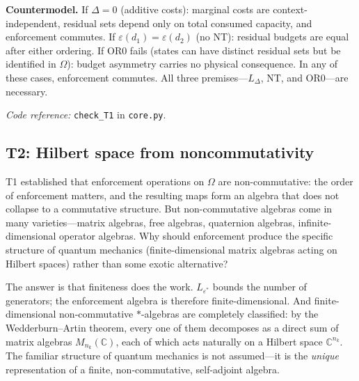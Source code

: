 \documentclass[11pt]{article}
\newcommand{\coderef}[2]{\smallskip\noindent\textit{Code reference:} \texttt{#1} in \texttt{#2}.}
\begin{document}
\begin{tcolorbox}[apfbox, title={Theorem T1 --- The Bridge Theorem (Order-Dependence)}]
\smallskip\noindent\textbf{Countermodel.}  If $\Delta = 0$ (additive costs): marginal costs are context-independent, residual sets depend only on total consumed capacity, and enforcement commutes.  If $\varepsilon(d_1) = \varepsilon(d_2)$ (no NT): residual budgets are equal after either ordering.  If OR0 fails (states can have distinct residual sets but be identified in $\Omega$): budget asymmetry carries no physical consequence.  In any of these cases, enforcement commutes.  All three premises---$L_\Delta$, NT, and OR0---are necessary.

\coderef{check\_T1}{core.py}
\end{tcolorbox}


\subsection{T2: Hilbert space from noncommutativity}

T1 established that enforcement operations on $\Omega$ are non-commutative: the order of enforcement matters, and the resulting maps form an algebra that does not collapse to a commutative structure.  But non-commutative algebras come in many varieties---matrix algebras, free algebras, quaternion algebras, infinite-dimensional operator algebras.  Why should enforcement produce the specific structure of quantum mechanics (finite-dimensional matrix algebras acting on Hilbert spaces) rather than some exotic alternative?

The answer is that finiteness does the work.  $L_{\varepsilon^*}$ bounds the number of generators; the enforcement algebra is therefore finite-dimensional.  And finite-dimensional non-commutative $*$-algebras are completely classified: by the Wedderburn--Artin theorem, every one of them decomposes as a direct sum of matrix algebras $M_{n_k}(\mathbb{C})$, each of which acts naturally on a Hilbert space $\mathbb{C}^{n_k}$.  The familiar structure of quantum mechanics is not assumed---it is the \emph{unique} representation of a finite, non-commutative, self-adjoint algebra.
\end{document}
